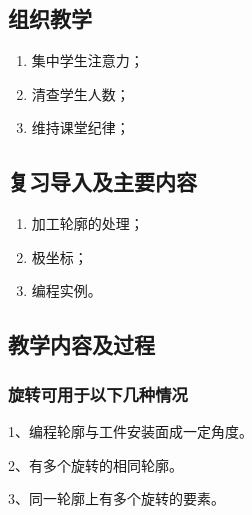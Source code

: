 \jxhj{%
	}

\makeshouye %

\subsection{组织教学}
\begin{enumerate}[\hspace{2em}1、]
	\item 集中学生注意力；
	\item 清查学生人数；
	\item 维持课堂纪律；
\end{enumerate}

\subsection{复习导入及主要内容}
\begin{enumerate}[1、]
\item 加工轮廓的处理；
\item 极坐标；
\item 编程实例。
\end{enumerate}

\subsection{教学内容及过程}
\subsubsection{旋转可用于以下几种情况}
	1、编程轮廓与工件安装面成一定角度。
	
	2、有多个旋转的相同轮廓。
	
	3、同一轮廓上有多个旋转的要素。
	
